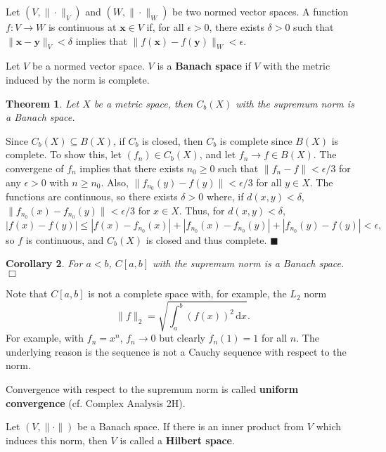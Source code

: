\documentclass[letter-paper]{tufte-book}
\newtheorem{theorem}{\color{pastel-blue}Theorem}[section]
\newtheorem{corollary}[theorem]{\color{pastel-blue}Corollary}
\newenvironment{proof}[1][Proof]{\begin{trivlist}
\item[\hskip \labelsep {\bfseries #1}]}{\end{trivlist}}
\newcommand{\xb}{\boldsymbol{x}}
\newcommand{\yb}{\boldsymbol{y}}
\newcommand{\qed}{\hfill$\blacksquare$}
\newcommand{\qedwhite}{\hfill \ensuremath{\Box}}
\begin{document}
Let $(V, \|\cdot\|_V)$ and $(W, \|\cdot\|_W)$ be two normed vector spaces. A
function $f : V \to W$ is continuous at $\xb \in V$ if, for all $\epsilon > 0$,
there exists $\delta > 0$ such that $\| \xb - \yb\|_V < \delta$ implies that
$\|f(\xb) - f(\yb)\|_W < \epsilon$.

Let $V$ be a normed vector space. $V$ is a \textbf{Banach space} if $V$ with
the metric induced by the norm is complete.

\begin{theorem}
  Let $X$ be a metric space, then $C_b(X)$ with the supremum norm is a Banach
  space.
\end{theorem}

\begin{proof}
  Since $C_b(X) \subseteq B(X)$, if $C_b$ is closed, then $C_b$ is complete
  since $B(X)$ is complete. To show this, let $(f_n) \in C_b(X)$, and let $f_n
  \to f \in B(X)$. The convergene of $f_n$ implies that there exists $n_0 \geq
  0$ such that $\|f_n - f\| < \epsilon /3$ for any $\epsilon > 0$ with $n \geq
  n_0$. Also, $\|f_{n_0}(y) - f(y)\| < \epsilon /3$ for all $y \in X$. The
  functions are continuous, so there exists $\delta > 0$ where, if $d(x, y) <
  \delta$, $\|f_{n_0}(x) - f_{n_0}(y)\| < \epsilon /3$ for $x \in X$. Thus, for
  $d(x, y) < \delta$,
  \begin{equation*}
    |f(x) - f(y)| \leq |f(x) - f_{n_0}(x)| + |f_{n_0}(x) - f_{n_0}(y)|
      + |f_{n_0}(y) - f(y)| < \epsilon,
  \end{equation*}
  so $f$ is continuous, and $C_b(X)$ is closed and thus complete. \qed
\end{proof}

\begin{corollary}
  For $a < b$, $C[a,b]$ with the supremum norm is a Banach space. \qedwhite
\end{corollary}

Note that $C[a,b]$ is not a complete space with, for example, the $L_2$ norm
\begin{equation*}
  \| f \|_2 = \sqrt{\int_a^b \left(f(x)\right)^2\, \mathrm{d}x}.
\end{equation*}
For example, with $f_n = x^n$, $f_n \to 0$ but clearly $f_n(1) = 1$ for all $n$.
The underlying reason is the sequence is not a Cauchy sequence with respect to
the norm.

Convergence with respect to the supremum norm is called \textbf{uniform
convergence} (cf. Complex Analysis 2H).

Let $(V, \|\cdot\|)$ be a Banach space. If there is an inner product from $V$
which induces this norm, then $V$ is called a \textbf{Hilbert space}.
\end{document}
